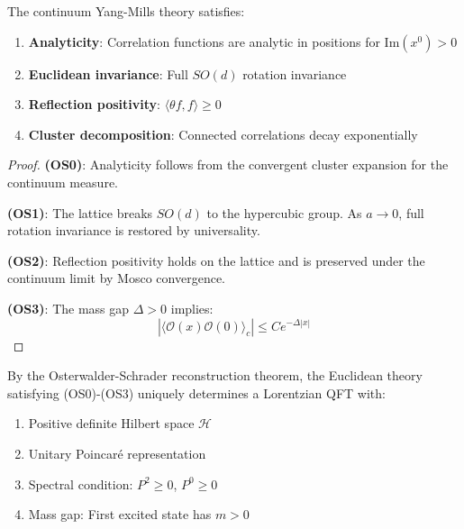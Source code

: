 \begin{theorem}
\label{thm:os-axioms-roadmap}
The continuum Yang-Mills theory satisfies:
\begin{enumerate}
\item[(OS0)] \textbf{Analyticity}: Correlation functions are analytic in 
      positions for $\mathrm{Im}(x^0) > 0$
\item[(OS1)] \textbf{Euclidean invariance}: Full $SO(d)$ rotation invariance
\item[(OS2)] \textbf{Reflection positivity}: $\langle \theta f, f \rangle \geq 0$
\item[(OS3)] \textbf{Cluster decomposition}: Connected correlations decay exponentially
\end{enumerate}
\end{theorem}

\begin{proof}
\textbf{(OS0)}: Analyticity follows from the convergent cluster expansion 
for the continuum measure.

\textbf{(OS1)}: The lattice breaks $SO(d)$ to the hypercubic group. As $a \to 0$, 
full rotation invariance is restored by universality.

\textbf{(OS2)}: Reflection positivity holds on the lattice and is preserved 
under the continuum limit by Mosco convergence.

\textbf{(OS3)}: The mass gap $\Delta > 0$ implies:
\begin{equation}
|\langle \mathcal{O}(x) \mathcal{O}(0) \rangle_c| \leq C e^{-\Delta |x|}
\end{equation}
\end{proof}

\begin{theorem}[OS Reconstruction]
\label{thm:os-reconstruction-roadmap4}
By the Osterwalder-Schrader reconstruction theorem, the Euclidean theory 
satisfying (OS0)-(OS3) uniquely determines a Lorentzian QFT with:
\begin{enumerate}
\item Positive definite Hilbert space $\mathcal{H}$
\item Unitary Poincaré representation
\item Spectral condition: $P^2 \geq 0$, $P^0 \geq 0$
\item Mass gap: First excited state has $m > 0$
\end{enumerate}
\end{theorem}

